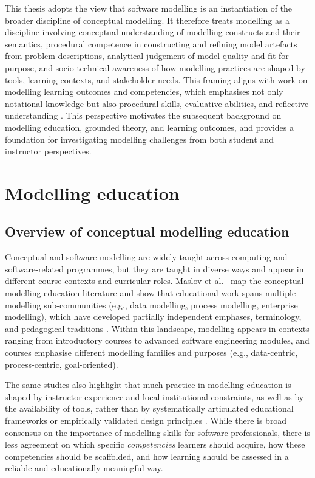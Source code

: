 This thesis adopts the view that software modelling is an instantiation of the broader discipline of conceptual modelling. It therefore treats modelling as a discipline involving conceptual understanding of modelling constructs and their semantics, procedural competence in constructing and refining model artefacts from problem descriptions, analytical judgement of model quality and fit-for-purpose, and socio-technical awareness of how modelling practices are shaped by tools, learning contexts, and stakeholder needs. This framing aligns with work on modelling learning outcomes and competencies, which emphasises not only notational knowledge but also procedural skills, evaluative abilities, and reflective understanding \cite{bogdanova2019camelot,bogdanova2017domain,bork2019framework,sedelmaier2013research}. This perspective motivates the subsequent background on modelling education, grounded theory, and learning outcomes, and provides a foundation for investigating modelling challenges from both student and instructor perspectives.

\section{Modelling education}
\label{sec:modelling_education}

\subsection{Overview of conceptual modelling education}
\label{subsec:overview_conceptual_modelling_education}

Conceptual and software modelling are widely taught across computing and software-related programmes, but they are taught in diverse ways and appear in different course contexts and curricular roles. Maslov et al.\ \cite{maslov2025conceptual} map the conceptual modelling education literature and show that educational work spans multiple modelling sub-communities (e.g., data modelling, process modelling, enterprise modelling), which have developed partially independent emphases, terminology, and pedagogical traditions \cite{maslov2025conceptual}. Within this landscape, modelling appears in contexts ranging from introductory courses to advanced software engineering modules, and courses emphasise different modelling families and purposes (e.g., data-centric, process-centric, goal-oriented).

The same studies also highlight that much practice in modelling education is shaped by instructor experience and local institutional constraints, as well as by the availability of tools, rather than by systematically articulated educational frameworks or empirically validated design principles \cite{maslov2025conceptual}. While there is broad consensus on the importance of modelling skills for software professionals, there is less agreement on which specific \emph{competencies} learners should acquire, how these competencies should be scaffolded, and how learning should be assessed in a reliable and educationally meaningful way.

